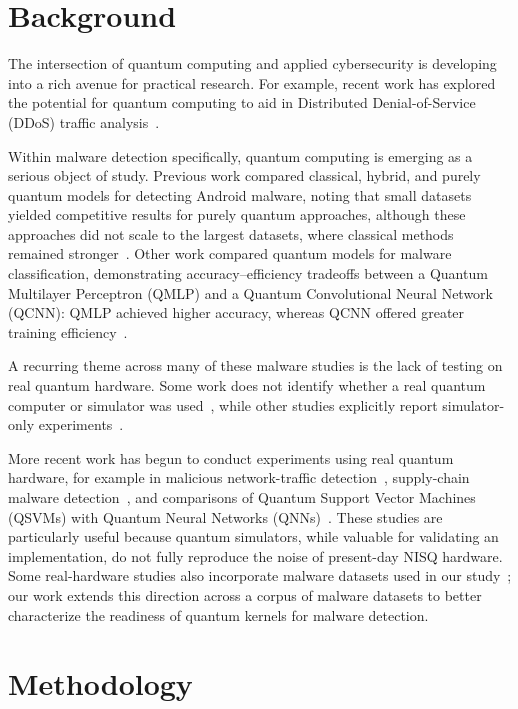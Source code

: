 \documentclass[letterpaper]{article} %
\begin{document}
\section{Background}

The intersection of quantum computing and applied cybersecurity is developing into a rich avenue for practical research. For example, recent work has explored the potential for quantum computing to aid in Distributed Denial-of-Service (DDoS) traffic analysis~\cite{cogburn2026hardwareawareqaoahoneypottraffic}.

Within malware detection specifically, quantum computing is emerging as a serious object of study. Previous work compared classical, hybrid, and purely quantum models for detecting Android malware, noting that small datasets yielded competitive results for purely quantum approaches, although these approaches did not scale to the largest datasets, where classical methods remained stronger~\cite{mercaldo2022towards}. Other work compared quantum models for malware classification, demonstrating accuracy--efficiency tradeoffs between a Quantum Multilayer Perceptron (QMLP) and a Quantum Convolutional Neural Network (QCNN): QMLP achieved higher accuracy, whereas QCNN offered greater training efficiency~\cite{11249907}.

A recurring theme across many of these malware studies is the lack of testing on real quantum hardware. Some work does not identify whether a real quantum computer or simulator was used~\cite{joshi2025quantumaialgorithmdevelopment}, while other studies explicitly report simulator-only experiments~\cite{10.1145/3538969.3543816,mercaldo2022towards,11249907,10.1145/3696673.3723063}.

More recent work has begun to conduct experiments using real quantum hardware, for example in malicious network-traffic detection~\cite{cotrupi}, supply-chain malware detection~\cite{11071553}, and comparisons of Quantum Support Vector Machines (QSVMs) with Quantum Neural Networks (QNNs)~\cite{10.1007/978-3-031-74643-7_19}. These studies are particularly useful because quantum simulators, while valuable for validating an implementation, do not fully reproduce the noise of present-day NISQ hardware. Some real-hardware studies also incorporate malware datasets used in our study~\cite{11071553}; our work extends this direction across a corpus of malware datasets to better characterize the readiness of quantum kernels for malware detection.

\section{Methodology}
\end{document}
